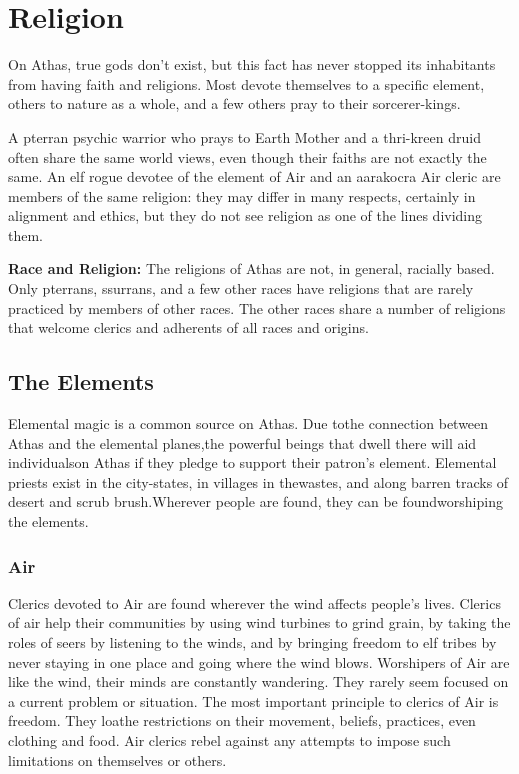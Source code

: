 \section{Religion}
On Athas, true gods don't exist, but this fact has never stopped its inhabitants from having faith and religions. Most devote themselves to a specific element, others to nature as a whole, and a few others pray to their sorcerer-kings.

A pterran psychic warrior who prays to Earth Mother and a thri-kreen druid often share the same world views, even though their faiths are not exactly the same. An elf rogue devotee of the element of Air and an aarakocra Air cleric are members of the same religion: they may differ in many respects, certainly in alignment and ethics, but they do not see religion as one of the lines dividing them.

\textbf{Race and Religion:} The religions of Athas are not, in general, racially based. Only pterrans, ssurrans, and a few other races have religions that are rarely practiced by members of other races. The other races share a number of religions that welcome clerics and adherents of all races and origins.

\subsection{The Elements}

Elemental magic is a common source on Athas. Due tothe connection between Athas and the elemental planes,the powerful beings that dwell there will aid individualson Athas if they pledge to support their patron's element. Elemental priests exist in the city-states, in villages in thewastes, and along barren tracks of desert and scrub brush.Wherever people are found, they can be foundworshiping the elements.

\subsubsection{Air}
Clerics devoted to Air are found wherever the wind affects people's lives. Clerics of air help their communities by using wind turbines to grind grain, by taking the roles of seers by listening to the winds, and by bringing freedom to elf tribes by never staying in one place and going where the wind blows. Worshipers of Air are like the wind, their minds are constantly wandering. They rarely seem focused on a current problem or situation. The most important principle to clerics of Air is freedom. They loathe restrictions on their movement, beliefs, practices, even clothing and food. Air clerics rebel against any attempts to impose such limitations on themselves or others.


